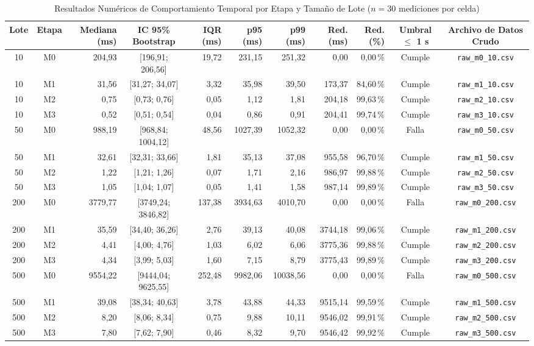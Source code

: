 \documentclass[conference]{IEEEtran}
\begin{document}
\begin{table}[!t]
\centering
\caption{Resultados Numéricos de Comportamiento Temporal por Etapa y Tamaño de Lote ($n=30$ mediciones por celda)}
\label{tab:resultados_detallados}
\scriptsize
\setlength{\tabcolsep}{2.2pt}
\begin{tabular}{|c|c|r|c|r|r|r|r|r|c|c|}
\hline
\textbf{Lote} & \textbf{Etapa} & \textbf{Mediana (ms)} & \textbf{IC 95\% Bootstrap} & \textbf{IQR (ms)} & \textbf{p95 (ms)} & \textbf{p99 (ms)} & \textbf{Red. (ms)} & \textbf{Red. (\%)} & \textbf{Umbral $\le$ 1 s} & \textbf{Archivo de Datos Crudo} \\
\hline
10 & M0 & 204,93 & [196,91; 206,56] & 19,72 & 231,15 & 251,32 & 0,00 & 0,00\,\% & Cumple & \texttt{raw\_m0\_10.csv} \\
10 & M1 & 31,56 & [31,27; 34,07] & 3,32 & 35,98 & 39,50 & 173,37 & 84,60\,\% & Cumple & \texttt{raw\_m1\_10.csv} \\
10 & M2 & 0,75 & [0,73; 0,76] & 0,05 & 1,12 & 1,81 & 204,18 & 99,63\,\% & Cumple & \texttt{raw\_m2\_10.csv} \\
10 & M3 & 0,52 & [0,51; 0,54] & 0,04 & 0,86 & 0,91 & 204,41 & 99,74\,\% & Cumple & \texttt{raw\_m3\_10.csv} \\
\hline
50 & M0 & 988,19 & [968,84; 1004,12] & 48,56 & 1027,39 & 1052,32 & 0,00 & 0,00\,\% & Falla & \texttt{raw\_m0\_50.csv} \\
50 & M1 & 32,61 & [32,31; 33,66] & 1,81 & 35,13 & 37,08 & 955,58 & 96,70\,\% & Cumple & \texttt{raw\_m1\_50.csv} \\
50 & M2 & 1,22 & [1,21; 1,26] & 0,07 & 1,71 & 2,16 & 986,97 & 99,88\,\% & Cumple & \texttt{raw\_m2\_50.csv} \\
50 & M3 & 1,05 & [1,04; 1,07] & 0,05 & 1,41 & 1,58 & 987,14 & 99,89\,\% & Cumple & \texttt{raw\_m3\_50.csv} \\
\hline
200 & M0 & 3779,77 & [3749,24; 3846,82] & 137,38 & 3934,63 & 4010,70 & 0,00 & 0,00\,\% & Falla & \texttt{raw\_m0\_200.csv} \\
200 & M1 & 35,59 & [34,40; 36,26] & 2,76 & 39,13 & 40,08 & 3744,18 & 99,06\,\% & Cumple & \texttt{raw\_m1\_200.csv} \\
200 & M2 & 4,41 & [4,00; 4,76] & 1,03 & 6,02 & 6,06 & 3775,36 & 99,88\,\% & Cumple & \texttt{raw\_m2\_200.csv} \\
200 & M3 & 4,34 & [3,99; 5,03] & 1,60 & 7,15 & 8,79 & 3775,43 & 99,89\,\% & Cumple & \texttt{raw\_m3\_200.csv} \\
\hline
500 & M0 & 9554,22 & [9444,04; 9625,55] & 252,48 & 9982,06 & 10038,56 & 0,00 & 0,00\,\% & Falla & \texttt{raw\_m0\_500.csv} \\
500 & M1 & 39,08 & [38,34; 40,63] & 3,78 & 43,88 & 44,33 & 9515,14 & 99,59\,\% & Cumple & \texttt{raw\_m1\_500.csv} \\
500 & M2 & 8,20 & [8,06; 8,34] & 0,75 & 9,88 & 10,11 & 9546,02 & 99,91\,\% & Cumple & \texttt{raw\_m2\_500.csv} \\
500 & M3 & 7,80 & [7,62; 7,90] & 0,46 & 8,32 & 9,70 & 9546,42 & 99,92\,\% & Cumple & \texttt{raw\_m3\_500.csv} \\
\hline
\end{tabular}
\end{table}
\end{document}
